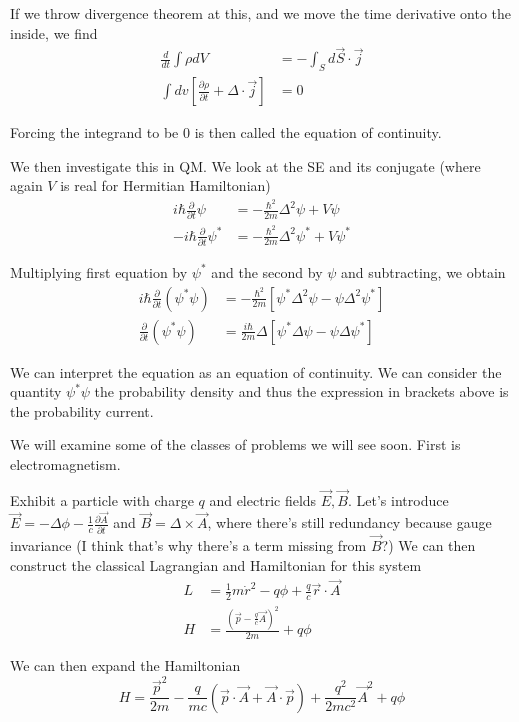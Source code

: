 \documentclass[10pt]{report}
\newcommand{\rd}[2]{\frac{d#1}{d#2}}
\newcommand{\pd}[2]{\frac{\partial #1}{\partial#2}}
\begin{document}
If we throw divergence theorem at this, and we move the time derivative onto the inside, we find
\begin{align}
	\rd{}{t}\int \rho dV &= -\int_S d\vec{S} \cdot \vec{j}\\
	\int dv \left[ \pd{\rho}{t} + \Delta\cdot \vec{j} \right] &= 0
\end{align}

Forcing the integrand to be $0$ is then called the equation of continuity.

We then investigate this in QM. We look at the SE and its conjugate (where again $V$ is real for Hermitian Hamiltonian)
\begin{align}
	i\hbar \pd{}{t}\psi &= -\frac{\hbar^2}{2m}\Delta^2\psi + V\psi\\
	-i\hbar \pd{}{t}\psi^* &= -\frac{\hbar^2}{2m}\Delta^2 \psi^* + V\psi^*
\end{align}

Multiplying first equation by $\psi^*$ and the second by $\psi$ and subtracting, we obtain 
\begin{align}
	i\hbar \pd{}{t} \left( \psi^*\psi \right) &= -\frac{\hbar^2}{2m} \left[ \psi^*\Delta^2\psi - \psi\Delta^2\psi^* \right]\\
	\pd{}{t} \left( \psi^*\psi \right) &= \frac{i\hbar}{2m} \Delta\left[ \psi^*\Delta\psi - \psi\Delta\psi^* \right]
\end{align}

We can interpret the equation as an equation of continuity. We can consider the quantity $\psi^*\psi$ the probability density and thus the expression in brackets above is the probability current.

We will examine some of the classes of problems we will see soon. First is electromagnetism.

Exhibit a particle with charge $q$ and electric fields $\vec{E},\vec{B}$. Let's introduce $\vec{E}=-\Delta\phi - \frac{1}{c}\pd{\vec{A}}{t}$ and $\vec{B} = \Delta\times\vec{A}$, where there's still redundancy because gauge invariance (I think that's why there's a term missing from $\vec{B}$?) We can then construct the classical Lagrangian and Hamiltonian for this system
\begin{align}
	L &= \frac{1}{2}m\dot{r}^2 - q\phi + \frac{q}{c}\vec{r}\cdot \vec{A}\\
	H &= \frac{\left( \vec{p}-\frac{q}{c}\vec{A} \right)^2}{2m} + q\phi
\end{align}

We can then expand the Hamiltonian
$$H = \frac{\vec{p}^2}{2m} - \frac{q}{mc} \left( \vec{p}\cdot \vec{A} + \vec{A} \cdot \vec{p} \right) + \frac{q^2}{2mc^2}\vec{A}^2 + q\phi$$
\end{document}
